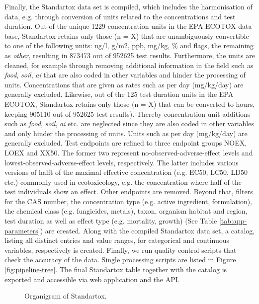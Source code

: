 Finally, the Standartox data set is compiled, which includes the harmonisation of data, e.g. through conversion of units related to the concentrations and test duration. Out of the unique 1229 concentration units in the EPA ECOTOX data base, Standartox retains only those (n = X) that are unambiguously convertible to one of the following units: ug/l, g/m2, ppb, mg/kg, \% and flags, the remaining as \textit{other}, resulting in 873473 out of 952625 test results. Furthermore, the units are cleaned, for example through removing additional information in the field such as \textit{food}, \textit{soil}, \textit{ai} that are also coded in other variables and hinder the processing of units. Concentrations that are given as rates such as per day (mg/kg/day) are generally excluded.
Likewise, out of the 125 test duration units in the EPA ECOTOX, Standartox retains only those (n = X) that can be converted to hours, keeping 905110 out of 952625 test results). Thereby concentration unit additions such as \textit{food}, \textit{soil}, \textit{ai} etc. are neglected since they are also coded in other variables and only hinder the processing of units. Units such as per day (mg/kg/day) are generally excluded. Test endpoints are refined to three endpoint groups NOEX, LOEX and XX50. The former two represent no-observed-adverse-effect levels and lowest-observed-adverse-effect levels, respectively. The latter includes various versions of halft of the maximal effective concentration (e.g. EC50, LC50, LD50 etc.) commonly used in ecotoxicology, e.g. the concentration where half of the test individuals show an effect. Other endpoints are removed. Beyond that, filters for the CAS number, the concentration type (e.g. active ingredient, formulation), the chemical class (e.g. fungicides, metals), taxon, organism habitat and region, test duration as well as effect type (e.g. mortality, growth) (See Table \ref{tab:app-parameters}) are created. Along with the compiled Standartox data set, a catalog, listing all distinct entries and value ranges, for categorical and continuous variables, respectively is created. Finally, we run quality control scripts that check the accuracy of the data. Single processing scripts are listed in Figure \ref{fig:pipeline-tree}. The final Standartox table together with the catalog is exported and accessible via web application and the API.

\begin{figure}
    
    \caption{Organigram of Standartox.}
    \label{fig:stx-organigram}
\end{figure}

